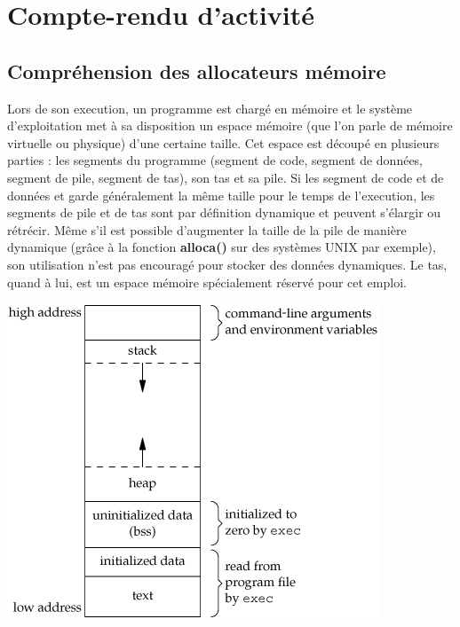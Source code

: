 \chapter{Compte-rendu d'activité}
\section{Compréhension des allocateurs mémoire}
Lors de son execution, un programme est chargé en mémoire et le système d'exploitation
met à sa disposition un espace mémoire (que l'on parle de mémoire virtuelle ou physique)
d'une certaine taille. Cet espace est découpé en plusieurs parties : les segments du programme
(segment de code, segment de données, segment de pile, segment de tas), son tas et sa pile. Si les segment de code et de
données et garde généralement la même taille pour le temps de l'execution, les segments de pile et de tas sont par définition
dynamique et peuvent s'élargir ou rétrécir. Même s'il est possible d'augmenter la taille de la pile de manière dynamique (grâce
à la fonction \textbf{alloca()} sur des systèmes UNIX par exemple), son utilisation n'est pas encouragé pour stocker des données
dynamiques. Le tas, quand à lui, est un espace mémoire spécialement réservé pour cet emploi.
\begin{center}
\includegraphics[scale=0.4]{memory-layout.png}\newline
\end{center}



